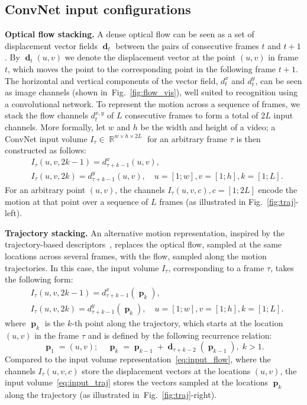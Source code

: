 \documentclass{article} %
\newcommand{\figref}[1]{Fig.~\ref{#1}}
\DeclareMathOperator{\Rbb}{\mathbb{R}}
\DeclareMathOperator{\dvec}{\mathrm{\textbf{d}}}
\DeclareMathOperator{\pvec}{\mathrm{\textbf{p}}}
\begin{document}
\subsection{ConvNet input configurations}
\label{sec:temp_net_input}

\noindent\textbf{Optical flow stacking.}
A dense optical flow can be seen as a set of displacement vector fields $\dvec_t$ between the pairs of consecutive frames $t$ and $t+1$. 
By $\dvec_t(u,v)$ we denote the displacement vector at the point $(u,v)$ in frame $t$, which moves the point to the corresponding point in the following frame $t+1$. 
The horizontal and vertical components of the vector field, $d^x_t$ and $d^y_t$,  can be seen as image channels (shown in~\figref{fig:flow_vis}), well suited to
recognition using a convolutional network. 
To represent the motion across a sequence of frames, we stack the flow channels $d^{x,y}_t$ of $L$ consecutive frames to form a total of $2L$ input channels. 
More formally, let $w$ and $h$ be the width and height of a video;
a ConvNet input volume $I_{\tau} \in \Rbb^{w \times h \times 2L}$ for an arbitrary frame $\tau$ is then constructed as follows:
\begin{align}
\label{eq:input_flow}
&I_{\tau}(u,v,2k-1) = d^x_{\tau+k-1}(u,v), \\
\nonumber&I_{\tau}(u,v,2k) = d^y_{\tau+k-1}(u,v), \quad u=[1;w], v=[1;h], k=[1;L]. 
\end{align}
For an arbitrary point $(u,v)$, the channels $I_{\tau}(u,v,c), c=[1;2L]$ encode the motion at that point over a sequence of $L$ frames (as illustrated in \figref{fig:traj}-left).

\noindent\textbf{Trajectory stacking.}
An alternative motion representation, inspired by the trajectory-based descriptors~\cite{Wang11b}, replaces the optical flow, sampled at the same locations across several frames,
with the flow, sampled along the motion trajectories. In this case, the input volume $I_{\tau}$, corresponding to a frame $\tau$, takes the following form:
\begin{align}
\label{eq:input_traj}
&I_{\tau}(u,v,2k-1) = d^x_{\tau+k-1}(\pvec_k), \\
\nonumber&I_{\tau}(u,v,2k) = d^y_{\tau+k-1}(\pvec_k), \quad u=[1;w], v=[1;h], k=[1;L].
\end{align}
where $\pvec_k$ is the $k$-th point along the trajectory, which starts at the location $(u,v)$ in the frame $\tau$ and is defined by the following recurrence relation:
\[
\pvec_1 = (u,v); ~~~~~
\pvec_k = \pvec_{k-1} + \dvec_{\tau+k-2}(\pvec_{k-1}),\; k > 1.
\]
Compared to the input volume representation~\eqref{eq:input_flow},
where the channels $I_{\tau}(u,v,c)$ store the displacement vectors at
the locations $(u,v)$, the input volume~\eqref{eq:input_traj} stores
the vectors sampled at the locations $\pvec_k$ along the trajectory
(as illustrated in~\figref{fig:traj}-right).
\end{document}
